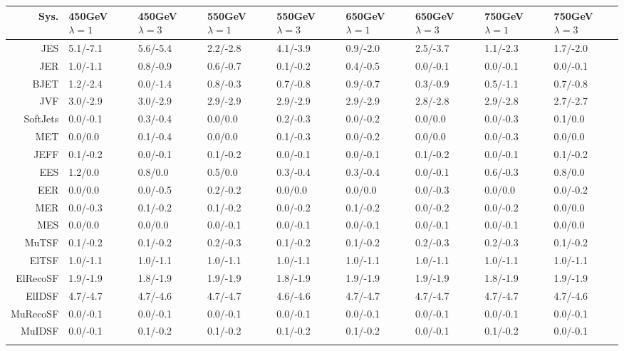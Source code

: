 \begin{tabular}{r|p{.08\linewidth}p{.08\linewidth}p{.08\linewidth}p{.08\linewidth}p{.08\linewidth}p{.08\linewidth}p{.08\linewidth}p{.08\linewidth}}
\toprule
 Sys.  & 450GeV $\lambda=1$  & 450GeV $\lambda=3$  & 550GeV $\lambda=1$  & 550GeV $\lambda=3$  & 650GeV $\lambda=1$  & 650GeV $\lambda=3$  & 750GeV $\lambda=1$  & 750GeV $\lambda=3$  \\
\toprule
JES  & 5.1/-7.1 & 5.6/-5.4 & 2.2/-2.8 & 4.1/-3.9 & 0.9/-2.0 & 2.5/-3.7 & 1.1/-2.3 & 1.7/-2.0 \\
JER  & 1.0/-1.1 & 0.8/-0.9 & 0.6/-0.7 & 0.1/-0.2 & 0.4/-0.5 & 0.0/-0.1 & 0.0/-0.1 & 0.0/-0.1 \\
BJET  & 1.2/-2.4 & 0.0/-1.4 & 0.8/-0.3 & 0.7/-0.8 & 0.9/-0.7 & 0.3/-0.9 & 0.5/-1.1 & 0.7/-0.8 \\
JVF  & 3.0/-2.9 & 3.0/-2.9 & 2.9/-2.9 & 2.9/-2.9 & 2.9/-2.9 & 2.8/-2.8 & 2.9/-2.8 & 2.7/-2.7 \\
SoftJets  & 0.0/-0.1 & 0.3/-0.4 & 0.0/0.0 & 0.2/-0.3 & 0.0/-0.2 & 0.0/0.0 & 0.0/-0.3 & 0.1/0.0 \\
MET  & 0.0/0.0 & 0.1/-0.4 & 0.0/0.0 & 0.1/-0.3 & 0.0/-0.2 & 0.0/0.0 & 0.0/-0.3 & 0.0/0.0 \\
JEFF  & 0.1/-0.2 & 0.0/-0.1 & 0.1/-0.2 & 0.0/-0.1 & 0.0/-0.1 & 0.1/-0.2 & 0.0/-0.1 & 0.1/-0.2 \\
EES  & 1.2/0.0 & 0.8/0.0 & 0.5/0.0 & 0.3/-0.4 & 0.3/-0.4 & 0.0/-0.1 & 0.6/-0.3 & 0.8/0.0 \\
EER  & 0.0/0.0 & 0.0/-0.5 & 0.2/-0.2 & 0.0/0.0 & 0.0/0.0 & 0.0/-0.3 & 0.0/0.0 & 0.0/-0.2 \\
MER  & 0.0/-0.3 & 0.1/-0.2 & 0.1/-0.2 & 0.0/-0.2 & 0.1/-0.2 & 0.0/-0.2 & 0.0/-0.2 & 0.0/0.0 \\
MES  & 0.0/0.0 & 0.0/0.0 & 0.0/-0.1 & 0.0/-0.1 & 0.0/-0.1 & 0.0/-0.1 & 0.0/-0.1 & 0.0/0.0 \\
MuTSF  & 0.1/-0.2 & 0.1/-0.2 & 0.2/-0.3 & 0.1/-0.2 & 0.1/-0.2 & 0.2/-0.3 & 0.2/-0.3 & 0.1/-0.2 \\
ElTSF  & 1.0/-1.1 & 1.0/-1.1 & 1.0/-1.1 & 1.0/-1.1 & 1.0/-1.1 & 1.0/-1.1 & 1.0/-1.1 & 1.0/-1.1 \\
ElRecoSF  & 1.9/-1.9 & 1.8/-1.9 & 1.9/-1.9 & 1.8/-1.9 & 1.9/-1.9 & 1.9/-1.9 & 1.8/-1.9 & 1.9/-1.9 \\
ElIDSF  & 4.7/-4.7 & 4.7/-4.6 & 4.7/-4.7 & 4.6/-4.6 & 4.7/-4.7 & 4.7/-4.7 & 4.7/-4.7 & 4.7/-4.6 \\
MuRecoSF  & 0.0/-0.1 & 0.0/-0.1 & 0.0/-0.1 & 0.0/-0.1 & 0.0/-0.1 & 0.0/-0.1 & 0.0/-0.1 & 0.0/-0.1 \\
MuIDSF  & 0.0/-0.1 & 0.1/-0.2 & 0.1/-0.2 & 0.1/-0.2 & 0.1/-0.2 & 0.0/-0.1 & 0.1/-0.2 & 0.0/-0.1 \\
 \\
\bottomrule
\end{tabular}
